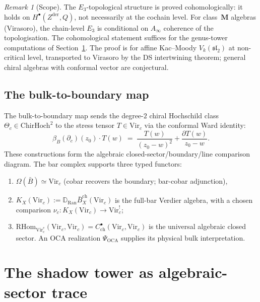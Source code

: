 \documentclass[11pt,reqno]{amsart}
\theoremstyle{definition}
\theoremstyle{remark}
\newtheorem{remark}[theorem]{Remark}
\begin{document}
\begin{remark}[Scope]
\label{rem:e3-scope}
The $E_3$-topological structure is proved cohomologically: it holds
on $H^\bullet(Z^{\mathrm{der}}, Q)$, not necessarily at the cochain
level. For class~$\mathbf{M}$ algebras (Virasoro), the chain-level
$E_3$ is conditional on $A_\infty$ coherence of the topologisation.
The cohomological statement suffices for the genus-tower
computations of Section~\ref{sec:shadow-as-gravity}. The proof is
for affine Kac--Moody $V_k(\mathfrak{sl}_2)$ at non-critical level,
transported to Virasoro by the DS intertwining theorem; general
chiral algebras with conformal vector are conjectural.
\end{remark}

\subsection{The bulk-to-boundary map}

The bulk-to-boundary map sends the degree-$2$ chiral Hochschild class
$\Theta_c \in \mathrm{ChirHoch}^2$ to the stress tensor
$T \in \mathrm{Vir}_c$ via the conformal Ward identity:
\begin{equation}\label{eq:bulk-boundary}
\beta_B(\partial_c)(z_0) \cdot T(w)
\;=\;
\frac{T(w)}{(z_0 - w)^2} + \frac{\partial T(w)}{z_0 - w}.
\end{equation}
These constructions form the algebraic
closed-sector/boundary/line comparison diagram.  The bar complex
supports three typed functors:
\begin{enumerate}[label=(\roman*)]
\item $\Omega(\bar{B}) \simeq \mathrm{Vir}_c$
  (cobar recovers the boundary; bar-cobar adjunction),
\item
  \(K_X(\mathrm{Vir}_c)
    :=\mathbb D_{\mathrm{Ran}}\bar B_X^{\mathrm{ch}}(\mathrm{Vir}_c)\)
  is the full-bar Verdier algebra, with a chosen comparison
  \(\nu_c\colon K_X(\mathrm{Vir}_c)\to\mathrm{Vir}_c^!\);
\item $\mathrm{RHom}_{\mathrm{Vir}_c^e}
  (\mathrm{Vir}_c,\mathrm{Vir}_c)
  =C^\bullet_{\mathrm{ch}}(\mathrm{Vir}_c,\mathrm{Vir}_c)$
  is the universal algebraic closed sector.  An OCA realization
  \(\Psi_{\mathrm{OCA}}\) supplies its physical bulk interpretation.
\end{enumerate}

\section{The shadow tower as algebraic-sector trace}
\label{sec:shadow-as-gravity}
\end{document}
